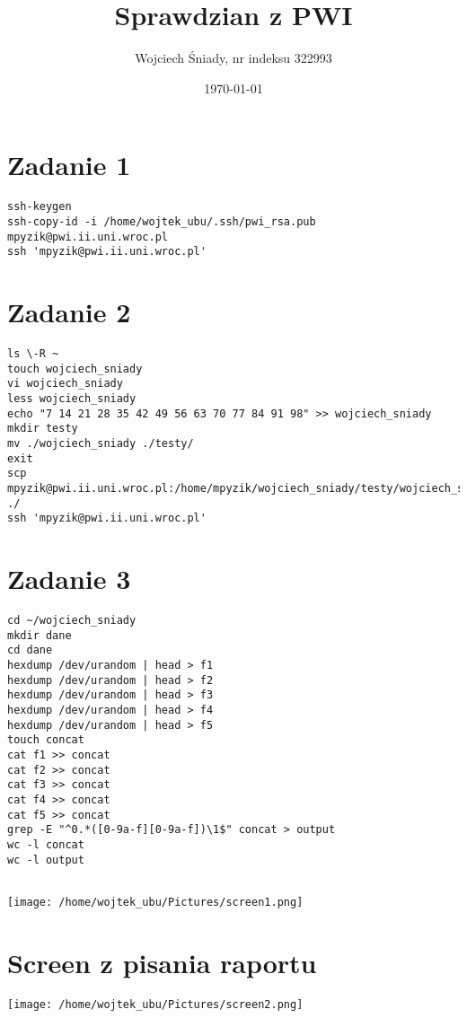 \documentclass[a4paper]{article}
\author{Wojciech Śniady, nr indeksu 322993}
\title{Sprawdzian z PWI}
\date{\today}
\begin{document}
 \maketitle
 
 \section{Zadanie 1}
 \begin{verbatim}
ssh-keygen
ssh-copy-id -i /home/wojtek_ubu/.ssh/pwi_rsa.pub mpyzik@pwi.ii.uni.wroc.pl
ssh 'mpyzik@pwi.ii.uni.wroc.pl'
\end{verbatim}

 \section{Zadanie 2}
  \begin{verbatim}
ls \-R ~
touch wojciech_sniady
vi wojciech_sniady
less wojciech_sniady
echo "7 14 21 28 35 42 49 56 63 70 77 84 91 98" >> wojciech_sniady
mkdir testy
mv ./wojciech_sniady ./testy/
exit
scp mpyzik@pwi.ii.uni.wroc.pl:/home/mpyzik/wojciech_sniady/testy/wojciech_sniady ./ 
ssh 'mpyzik@pwi.ii.uni.wroc.pl'

\end{verbatim}

 \section{Zadanie 3}
 \begin{verbatim}
cd ~/wojciech_sniady
mkdir dane
cd dane
hexdump /dev/urandom | head > f1
hexdump /dev/urandom | head > f2
hexdump /dev/urandom | head > f3
hexdump /dev/urandom | head > f4
hexdump /dev/urandom | head > f5
touch concat
cat f1 >> concat
cat f2 >> concat
cat f3 >> concat
cat f4 >> concat
cat f5 >> concat 
grep -E "^0.*([0-9a-f][0-9a-f])\1$" concat > output
wc -l concat 
wc -l output


\end{verbatim}

 \texttt{[image: /home/wojtek\_ubu/Pictures/screen1.png]}

  \section{Screen z pisania raportu}
  
   \texttt{[image: /home/wojtek\_ubu/Pictures/screen2.png]}

 
\end{document}
